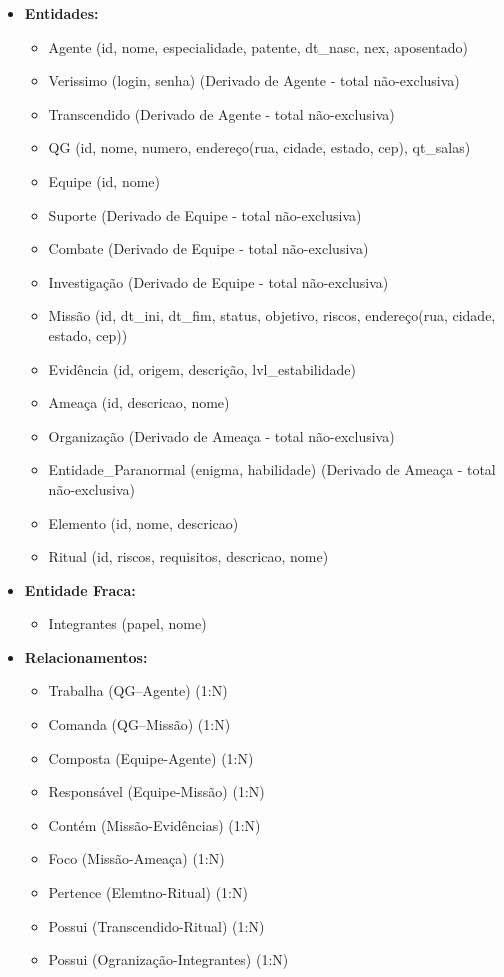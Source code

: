 \documentclass[12pt,a4paper]{report}
\begin{document}
\begin{itemize}
  \item \textbf{Entidades:}
  \begin{itemize}
    \item Agente (id, nome, especialidade, patente, dt\_nasc, nex, aposentado)
    \item Verissimo (login, senha) (Derivado de Agente - total não-exclusiva) 
    \item Transcendido (Derivado de Agente - total não-exclusiva) 
    \item QG (id, nome, numero, endereço(rua, cidade, estado, cep), qt\_salas)
    \item Equipe (id, nome)
    \item Suporte (Derivado de Equipe - total não-exclusiva)
    \item Combate (Derivado de Equipe - total não-exclusiva)
    \item Investigação (Derivado de Equipe - total não-exclusiva)
    \item Missão (id, dt\_ini, dt\_fim, status, objetivo, riscos, endereço(rua, cidade, estado, cep))
    \item Evidência (id, origem, descrição, lvl\_estabilidade)
    \item Ameaça (id, descricao, nome)
    \item Organização (Derivado de Ameaça - total não-exclusiva)
    \item Entidade\_Paranormal (enigma, habilidade) (Derivado de Ameaça - total não-exclusiva)
    \item Elemento (id, nome, descricao)
    \item Ritual (id, riscos, requisitos, descricao, nome)
  \end{itemize}

  \item \textbf{Entidade Fraca: }
        \begin{itemize}
            \item Integrantes (papel, nome)
        \end{itemize}

  \item \textbf{Relacionamentos:}
  \begin{itemize}
    \item Trabalha (QG–Agente) (1:N)
    \item Comanda (QG–Missão) (1:N)
    \item Composta (Equipe-Agente) (1:N)
    \item Responsável (Equipe-Missão) (1:N)
    \item Contém (Missão-Evidências) (1:N)
    \item Foco (Missão-Ameaça) (1:N)
    \item Pertence (Elemtno-Ritual) (1:N)
    \item Possui (Transcendido-Ritual) (1:N)
    \item Possui (Ogranização-Integrantes) (1:N)
  \end{itemize}


\end{itemize}
\end{document}
